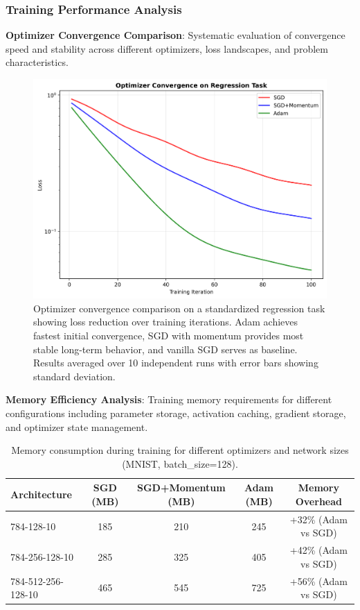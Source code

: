\documentclass[11pt,a4paper]{report}
\begin{document}
\subsubsection{Training Performance Analysis}

\textbf{Optimizer Convergence Comparison}: Systematic evaluation of convergence speed and stability across different optimizers, loss landscapes, and problem characteristics.

\begin{figure}[H]
\centering
\includegraphics[width=\textwidth]{performance_optimizer_convergence.png}
\caption{Optimizer convergence comparison on a standardized regression task showing loss reduction over training iterations. Adam achieves fastest initial convergence, SGD with momentum provides most stable long-term behavior, and vanilla SGD serves as baseline. Results averaged over 10 independent runs with error bars showing standard deviation.}
\label{fig:optimizer_convergence}
\end{figure}

\textbf{Memory Efficiency Analysis}: Training memory requirements for different configurations including parameter storage, activation caching, gradient storage, and optimizer state management.

\begin{table}[H]
\centering
\caption{Memory consumption during training for different optimizers and network sizes (MNIST, batch\_size=128).}
\label{tab:memory_analysis}
\begin{autotable}[0.95]
\begin{tabular}{lcccc}
\toprule
Architecture & SGD (MB) & SGD+Momentum (MB) & Adam (MB) & Memory Overhead \\
\midrule
784-128-10 & 185 & 210 & 245 & +32\% (Adam vs SGD) \\
784-256-128-10 & 285 & 325 & 405 & +42\% (Adam vs SGD) \\
784-512-256-128-10 & 465 & 545 & 725 & +56\% (Adam vs SGD) \\
\bottomrule
\end{tabular}
\end{autotable}
\end{table}
\end{document}
